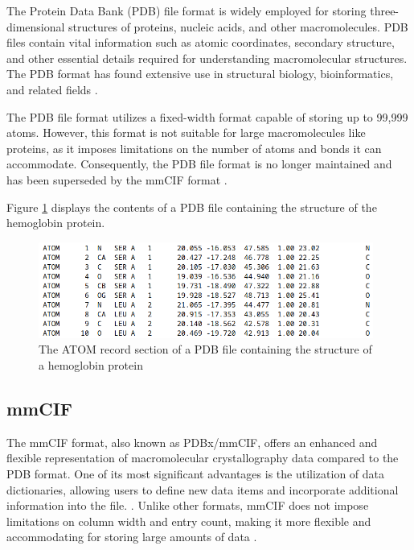 \documentclass[
  digital,     %
  oneside,     %
  nosansbold,  %
  nocolorbold, %
  lof,         %
  lot,         %
]{fithesis4}
\begin{document}
The Protein Data Bank (PDB) file format is widely employed for storing three-dimensional structures of proteins, nucleic acids, and other macromolecules. PDB files contain vital information such as atomic coordinates, secondary structure, and other essential details required for understanding macromolecular structures. The PDB format has found extensive use in structural biology, bioinformatics, and related fields \cite{pdb101}.

The PDB file format utilizes a fixed-width format capable of storing up to 99,999 atoms. \cite{} However, this format is not suitable for large macromolecules like proteins, as it imposes limitations on the number of atoms and bonds it can accommodate. Consequently, the PDB file format is no longer maintained and has been superseded by the mmCIF format \cite{pdb101}.

Figure \ref{fig:pdb} displays the contents of a PDB file containing the structure of the hemoglobin protein.

\begin{figure}[htbp]
  \begin{center}
    \includegraphics[width=11cm]{figures/3bj1_pdb.png}
  \end{center}
  \caption{The ATOM record section of a PDB file containing the structure of a hemoglobin protein}
  \label{fig:pdb}
\end{figure}

\subsection{mmCIF}
\label{subsection:mmcif}

The mmCIF format, also known as PDBx/mmCIF, offers an enhanced and flexible representation of macromolecular crystallography data compared to the PDB format. \cite{} One of its most significant advantages is the utilization of data dictionaries, allowing users to define new data items and incorporate additional information into the file. \cite{pdb101}. Unlike other formats, mmCIF does not impose limitations on column width and entry count, making it more flexible and accommodating for storing large amounts of data \cite{pdb101}.
\end{document}
